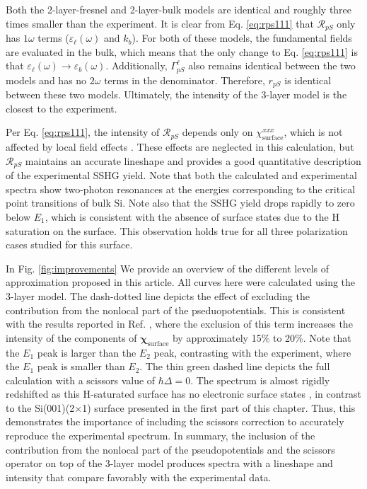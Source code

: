 Both the 2-layer-fresnel and 2-layer-bulk models are identical and roughly three
times smaller than the experiment. It is clear from Eq. \eqref{eq:rps111} that
$\mathcal{R}_{pS}$ only has $1\omega$ terms ($\varepsilon_{\ell}(\omega)$ and
$k_{b}$). For both of these models, the fundamental fields are evaluated in the
bulk, which means that the only change to Eq. \eqref{eq:rps111} is that
$\varepsilon_{\ell}(\omega) \rightarrow \varepsilon_{b}(\omega)$. Additionally,
$\Gamma^{\ell}_{pS}$ also remains identical between the two models and has no
$2\omega$ terms in the denominator. Therefore, $r_{pS}$ is identical between
these two models. Ultimately, the intensity of the 3-layer model is the closest
to the experiment.

Per Eq. \eqref{eq:rps111}, the intensity of $\mathcal{R}_{pS}$ depends only on
$\chi^{xxx}_{\mathrm{surface}}$, which is not affected by local field effects
\cite{tancognedejean:tel-01235611}. These effects are neglected in this
calculation, but $\mathcal{R}_{pS}$ maintains an accurate lineshape and provides
a good quantitative description of the experimental SSHG yield. Note that both
the calculated and experimental spectra show two-photon resonances at the
energies corresponding to the critical point transitions of bulk Si. Note also
that the SSHG yield drops rapidly to zero below $E_{1}$, which is consistent
with the absence of surface states due to the H saturation on the surface. This
observation holds true for all three polarization cases studied for this
surface.

In Fig. \ref{fig:improvements} We provide an overview of the different levels of
approximation proposed in this article. All curves here were calculated using
the 3-layer model. The dash-dotted line depicts the effect of excluding the
contribution from the nonlocal part of the pseduopotentials. This is consistent
with the results reported in Ref. \cite{andersonPRB15}, where the exclusion of
this term increases the intensity of the components of
$\boldsymbol{\chi}_{\mathrm{surface}}$ by approximately 15\% to 20\%. Note that
the $E_{1}$ peak is larger than the $E_{2}$ peak, contrasting with the
experiment, where the $E_{1}$ peak is smaller than $E_{2}$. The thin green
dashed line depicts the full calculation with a scissors value of $\hbar\Delta =
0$. The spectrum is almost rigidly redshifted as this H-saturated surface has no
electronic surface states \cite{andersonPRB15}, in contrast to the
Si(001)(2$\times$1) surface presented in the first part of this chapter. Thus,
this demonstrates the importance of including the scissors correction to
accurately reproduce the experimental spectrum. In summary, the inclusion of the
contribution from the nonlocal part of the pseudopotentials and the scissors
operator on top of the 3-layer model produces spectra with a lineshape and
intensity that compare favorably with the experimental data.

